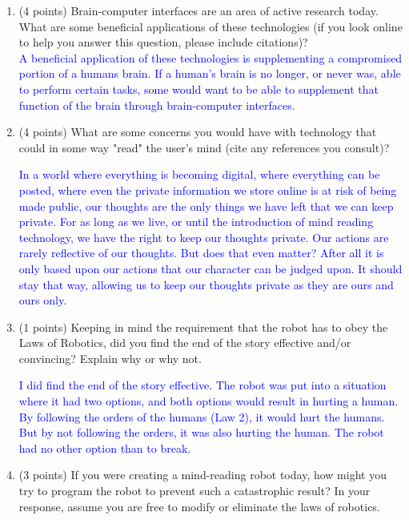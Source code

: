 \documentclass[12pt]{article}
\newenvironment{qparts}{\begin{enumerate}[{(}a{)}]}{\end{enumerate}}
\begin{document}
\begin{qparts}
  \item (4 points) Brain-computer interfaces are an area of active research today. What are some beneficial applications of these technologies (if you look online to help you answer this question, please include citations)? \\

  \textcolor{blue}{A beneficial application of these technologies is supplementing a compromised portion of a humans brain. If a human's brain is no longer, or never was, able to perform certain tasks, some would want to be able to supplement that function of the brain through brain-computer interfaces.}

  \vspace{1cm}

  \item (4 points) What are some concerns you would have with technology that could in some way "read" the user's mind (cite any references you consult)?

  \textcolor{blue}{In a world where everything is becoming digital, where everything can be posted, where even the private information we store online is at risk of being made public, our thoughts are the only things we have left that we can keep private. For as long as we live, or until the introduction of mind reading technology, we have the right to keep our thoughts private. Our actions are rarely reflective of our thoughts. But does that even matter? After all it is only based upon our actions that our character can be judged upon. It should stay that way, allowing us to keep our thoughts private as they are ours and ours only.}

  \vspace{1cm}


  \item (1 points) Keeping in mind the requirement that the robot has to obey the Laws of Robotics, did you find the end of the story effective and/or convincing? Explain why or why not.

  \textcolor{blue}{I did find the end of the story effective. The robot was put into a situation where it had two options, and both options would result in hurting a human. By following the orders of the humans (Law 2), it would hurt the humans. But by not following the orders, it was also hurting the human. The robot had no other option than to break.}

  \vspace{1cm}

  \item (3 points) If you were creating a mind-reading robot today, how might you try to program the robot to prevent such a catastrophic result? In your response, assume you are free to modify or eliminate the laws of robotics. \\


\end{qparts}
\end{document}
